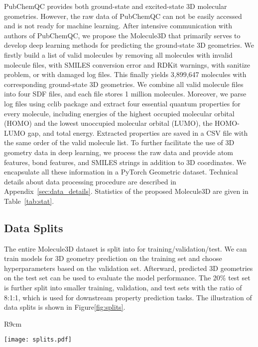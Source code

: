 \documentclass{article}
\begin{document}
PubChemQC provides both ground-state and excited-state 3D molecular geometries. However, the raw data of PubChemQC can not be easily accessed and is not ready for machine learning. After intensive communication with authors of PubChemQC, we propose the Molecule3D that primarily serves to develop deep learning methods for predicting the ground-state 3D geometries. We firstly build a list of valid molecules by removing all molecules with invalid molecule files, with SMILES conversion error and RDKit warnings, with sanitize problem, or with damaged log files. This finally yields 3,899,647 molecules with corresponding ground-state 3D geometries. We combine all valid molecule files into four SDF files, and each file stores 1 million molecules. Moreover, we parse log files using cclib package \cite{o2008cclib} and extract four essential quantum properties for every molecule, including energies of the highest occupied molecular orbital (HOMO) and the lowest unoccupied molecular orbital (LUMO), the HOMO-LUMO gap, and total energy. Extracted properties are saved in a CSV file with the same order of the valid molecule list. To further facilitate the use of 3D geometry data in deep learning, we process the raw data and provide atom features, bond features, and SMILES strings in addition to 3D coordinates. We encapsulate all these information in a PyTorch Geometric dataset. Technical details about data processing procedure are described in Appendix~\ref{sec:data_details}. Statistics of the proposed Molecule3D are given in Table~\ref{tab:stat}.



\subsection{Data Splits}\label{subsec: splits}


The entire Molecule3D dataset is split into  for training/validation/test. We can train models for 3D geometry prediction on the training set and choose hyperparameters based on the validation set. Afterward, predicted 3D geometries on the test set can be used to evaluate the model performance. The 20\% test set is further split into smaller training, validation, and test sets with the ratio of 8:1:1, which is used for downstream property prediction tasks. The illustration of data splits is shown in Figure\ref{fig:splits}.

\begin{wrapfigure}[12]{R}{9cm}\vspace{-0.5cm}
  \begin{center}
    \texttt{[image: splits.pdf]}
  \end{center}
  \caption{Data splits. For both random and scaffold split, 3D geometries prediction task involves the entire dataset, while downstream property prediction task uses only 20\% of data.}
  \label{fig:splits}
\end{wrapfigure}
\end{document}
